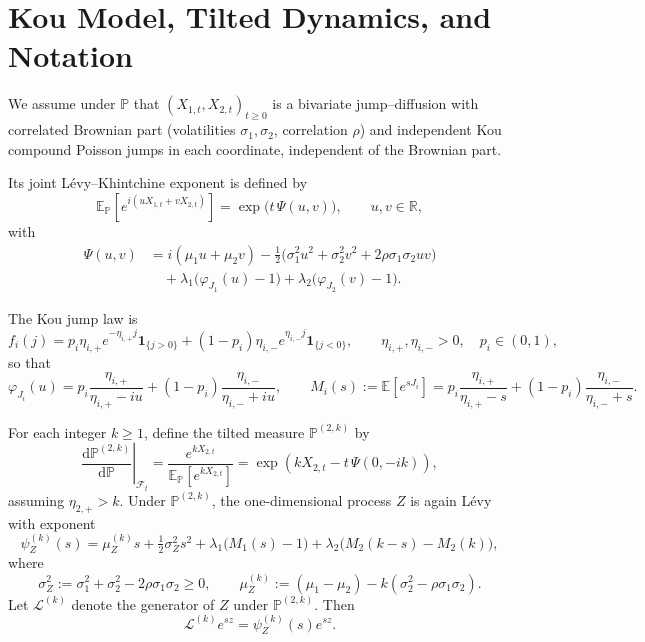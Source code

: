 \documentclass{article}
\newcommand{\E}{\mathbb{E}}
\renewcommand{\P}{\mathbb{P}}
\newcommand{\R}{\mathbb{R}}
\newcommand{\diff}{\mathrm{d}}
\newcommand{\F}{\mathcal{F}}
\newcommand{\one}{\mathbf{1}}
\theoremstyle{definition}
\begin{document}
\section{Kou Model, Tilted Dynamics, and Notation}

We assume under $\P$ that $(X_{1,t},X_{2,t})_{t\ge 0}$ is a bivariate jump--diffusion with correlated Brownian part
(volatilities $\sigma_1,\sigma_2$, correlation $\rho$) and independent Kou compound Poisson jumps in each coordinate,
independent of the Brownian part.

Its joint L\'evy--Khintchine exponent is defined by
\[
\E_{\P}\!\left[e^{i(uX_{1,t}+vX_{2,t})}\right]=\exp\!\big(t\,\Psi(u,v)\big),\qquad u,v\in\R,
\]
with
\begin{equation}\label{eq:Psi}
\boxed{
\begin{aligned}
\Psi(u,v)
&= i(\mu_1 u+\mu_2 v)
-\tfrac12\Big(\sigma_1^2u^2+\sigma_2^2v^2+2\rho\sigma_1\sigma_2uv\Big)\\
&\quad +\lambda_1\big(\varphi_{J_1}(u)-1\big)
+\lambda_2\big(\varphi_{J_2}(v)-1\big).
\end{aligned}}
\end{equation}

The Kou jump law is
\[
f_i(j)
=
p_i\eta_{i,+}e^{-\eta_{i,+}j}\one_{\{j>0\}}
+
(1-p_i)\eta_{i,-}e^{\eta_{i,-}j}\one_{\{j<0\}},
\qquad
\eta_{i,+},\eta_{i,-}>0,
\quad
p_i\in(0,1),
\]
so that
\begin{equation}\label{eq:Kou-char-mgf}
\boxed{
\varphi_{J_i}(u)
=
p_i\frac{\eta_{i,+}}{\eta_{i,+}-iu}
+
(1-p_i)\frac{\eta_{i,-}}{\eta_{i,-}+iu},
\qquad
M_i(s):=\E[e^{sJ_i}]
=
p_i\frac{\eta_{i,+}}{\eta_{i,+}-s}
+
(1-p_i)\frac{\eta_{i,-}}{\eta_{i,-}+s}.
}
\end{equation}

For each integer $k\ge 1$, define the tilted measure $\P^{(2,k)}$ by
\[
\left.\frac{\diff\P^{(2,k)}}{\diff\P}\right|_{\F_t}
=
\frac{e^{kX_{2,t}}}{\E_{\P}[e^{kX_{2,t}}]}
=
\exp\!\left(kX_{2,t}-t\,\Psi(0,-ik)\right),
\]
assuming $\eta_{2,+}>k$. Under $\P^{(2,k)}$, the one-dimensional process $Z$ is again L\'evy with exponent
\begin{equation}\label{eq:psiZk}
\boxed{
\psi_Z^{(k)}(s)
=
\mu_Z^{(k)}s+\tfrac12\sigma_Z^2 s^2
+\lambda_1\big(M_1(s)-1\big)
+\lambda_2\big(M_2(k-s)-M_2(k)\big),
}
\end{equation}
where
\[
\sigma_Z^2:=\sigma_1^2+\sigma_2^2-2\rho\sigma_1\sigma_2 \ge 0,
\qquad
\mu_Z^{(k)}:=(\mu_1-\mu_2)-k(\sigma_2^2-\rho\sigma_1\sigma_2).
\]
Let $\mathcal L^{(k)}$ denote the generator of $Z$ under $\P^{(2,k)}$. Then
\begin{equation}\label{eq:generator-eigen}
\boxed{
\mathcal L^{(k)}e^{sz}=\psi_Z^{(k)}(s)e^{sz}.
}
\end{equation}
\end{document}
